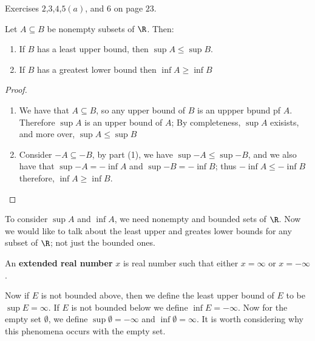 \begin{HW}
  Exercises $2$,$3$,$4$,$5(a)$, and $6$ on page $23$.
\end{HW}

\begin{theorem}
  Let $A \subseteq B$ be nonempty subsets of $\R$. Then:
  \begin{enumerate}[label=(\arabic*)]
    \item If $B$ has a least upper bound, then $\sup{A} \leq \sup{B}$.

    \item If $B$ has a greatest lower bound then  $\inf{A} \geq \inf{B}$
  \end{enumerate}
\end{theorem}
\begin{proof}
  \begin{enumerate}
    \item We have that $A \subseteq B$, so any upper bound of $B$ is an uppper bpund pf $A$. Therefore $\sup{A}$ is an upper 
        bound of $A$; By completeness, $\sup{A}$ exisists, and more over, $\sup{A} \leq \sup{B}$

    \item Consider $-A \subseteq -B$, by part (1), we have $\sup{-A} \leq \sup{-B}$, and we also have that $\sup{-A}=-\inf{A}$ 
        and $\sup{-B}=-\inf{B}$; thus $-\inf{A} \leq -\inf{B}$ therefore, $\inf{A} \geq \inf{B}$.
  \end{enumerate}
\end{proof}

To consider $\sup{A}$ and $\inf{A}$, we need nonempty and bounded sets of $\R$. Now we would like to talk about the least 
upper and greates lower bounds for any subset of $\R$; not just the bounded ones.

\begin{definition}
  An \textbf{extended real number} $x$ is real number such that either $x=\infty$ or $x=-\infty$.
\end{definition}

Now if $E$ is not bounded above, then we define the least upper bound of $E$ to be $\sup{E}=\infty$. If $E$ is not bounded 
below we define $\inf{E}=-\infty$. Now for the empty set $\emptyset$, we define $\sup{\emptyset}=-\infty$ and $\inf{\emptyset}=\infty$. 
It is worth considering why this phenomena occurs with the empty set.
